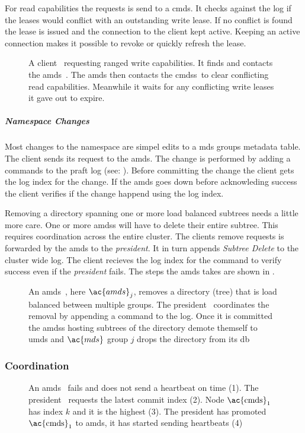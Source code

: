 For read capabilities the requests is send to a \ac{cmds}. It checks against the \raft{} log if the leases would conflict with an outstanding write lease. If no conflict is found the lease is issued and the connection to the client kept active. Keeping an active connection makes it possible to revoke or quickly refresh the lease.
%
\begin{figure}[htbp]
	\centering
	
	\caption{A client~\clientLeg{} requesting ranged write capabilities. It finds and contacts the \ac{amds}~\amdsLeg{}. The \ac{amds} then contacts the \acp{cmds}~\cmdsLeg to clear conflicting read capabilities. Meanwhile it waits for any conflicting write leases it gave out to expire.}
	\label{fig:write}
\end{figure}
%
\subparagraph*{Namespace Changes}
Most changes to the namespace are simpel edits to a \ac{mds} groups metadata table. The client sends its request to the \ac{amds}. The change is performed by adding a commands to the \ac{praft} log (see: ). Before committing the change the client gets the log index for the change. If the \ac{amds} goes down before acknowleding success the client verifies if the change happend using the log index.

Removing a directory spanning one or more load balanced subtrees needs a little more care. One or more \acp{amds} will have to delete their entire subtree. This requires coordination across the entire cluster. The clients remove requests is forwarded by the \ac{amds} to the \textit{president}. It in turn appends \textsl{Subtree Delete} to the cluster wide log. The client recieves the log index for the command to verify success even if the \textit{president} fails. The steps the \ac{amds} takes are shown in . 
%
\begin{figure}[htbp]
	\centering
	
	\caption{An \ac{amds}~\amdsLeg{}, here $\ac{amds}_j$, removes a directory (tree) that is load balanced between multiple groups. The president~\presidentLeg{} coordinates the removal by appending a command to the log. Once it is committed the \acp{amds} hosting subtrees of the directory demote themself to \ac{umds} and $\ac{mds}$ group $j$ drops the directory from its db}
	\label{fig:rm}
\end{figure}
%
\subsubsection*{Coordination}

\begin{figure}[htbp]
	\centering
	
	\caption{An \ac{amds}~\amdsLeg{} fails and does not send a heartbeat on time (1). The president~\presidentLeg{} requests the latest commit index (2). Node $\text{\ac{cmds}}_1$~\cmdsLeg{} has index $k$ and it is the highest (3). The president has promoted $\text{\ac{cmds}}_1$ to \ac{amds}, it has started sending heartbeats (4)}
	\label{fig:appoint}
\end{figure}


